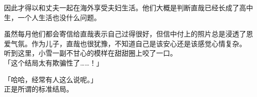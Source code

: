 因此才得以和丈夫一起在海外享受夫妇生活。他们大概是判断直哉已经长成了高中生，一个人生活也没什么问题。

虽然每月他们都会寄信给直哉表示自己过得很好，但信中付上的照片总是浸透了恩爱气氛。作为儿子，直哉也很犹豫，不知道自己是该安心还是该感觉心情复杂。\\

听到这里，小雪一副不甘心的模样在甜甜圈上咬了一口。\\

「这个结局太有欺骗性了……！」

「哈哈，经常有人这么说呢。」\\

正是所谓的标准结局。
